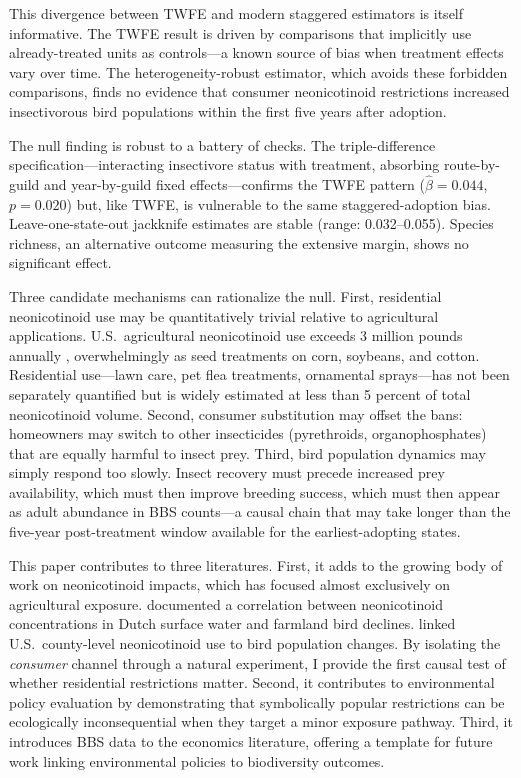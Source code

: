 \documentclass[12pt]{article}
\begin{document}
This divergence between TWFE and modern staggered estimators is itself informative. The TWFE result is driven by comparisons that implicitly use already-treated units as controls---a known source of bias when treatment effects vary over time. The heterogeneity-robust estimator, which avoids these forbidden comparisons, finds no evidence that consumer neonicotinoid restrictions increased insectivorous bird populations within the first five years after adoption.

The null finding is robust to a battery of checks. The triple-difference specification---interacting insectivore status with treatment, absorbing route-by-guild and year-by-guild fixed effects---confirms the TWFE pattern ($\hat{\beta} = 0.044$, $p = 0.020$) but, like TWFE, is vulnerable to the same staggered-adoption bias. Leave-one-state-out jackknife estimates are stable (range: 0.032--0.055). Species richness, an alternative outcome measuring the extensive margin, shows no significant effect.

Three candidate mechanisms can rationalize the null. First, residential neonicotinoid use may be quantitatively trivial relative to agricultural applications. U.S.\ agricultural neonicotinoid use exceeds 3 million pounds annually \citep{douglassamples2015}, overwhelmingly as seed treatments on corn, soybeans, and cotton. Residential use---lawn care, pet flea treatments, ornamental sprays---has not been separately quantified but is widely estimated at less than 5 percent of total neonicotinoid volume. Second, consumer substitution may offset the bans: homeowners may switch to other insecticides (pyrethroids, organophosphates) that are equally harmful to insect prey. Third, bird population dynamics may simply respond too slowly. Insect recovery must precede increased prey availability, which must then improve breeding success, which must then appear as adult abundance in BBS counts---a causal chain that may take longer than the five-year post-treatment window available for the earliest-adopting states.

This paper contributes to three literatures. First, it adds to the growing body of work on neonicotinoid impacts, which has focused almost exclusively on agricultural exposure. \citet{hallmann2014declines} documented a correlation between neonicotinoid concentrations in Dutch surface water and farmland bird declines. \citet{li2023landscape} linked U.S.\ county-level neonicotinoid use to bird population changes. By isolating the \textit{consumer} channel through a natural experiment, I provide the first causal test of whether residential restrictions matter. Second, it contributes to environmental policy evaluation by demonstrating that symbolically popular restrictions can be ecologically inconsequential when they target a minor exposure pathway. Third, it introduces BBS data to the economics literature, offering a template for future work linking environmental policies to biodiversity outcomes.
\end{document}
